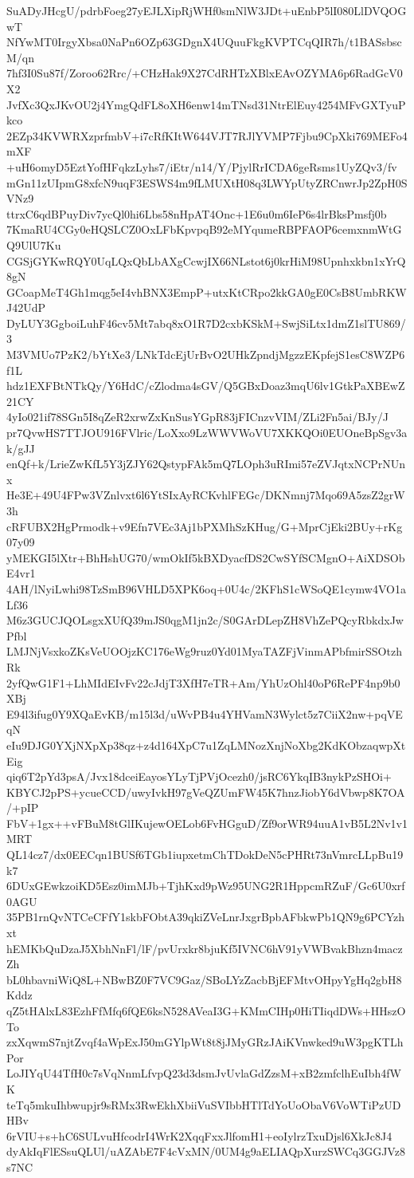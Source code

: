 SuADyJHcgU/pdrbFoeg27yEJLXipRjWHf0smNlW3JDt+uEnbP5lI080LlDVQOGwT
NfYwMT0IrgyXbsa0NaPn6OZp63GDgnX4UQuuFkgKVPTCqQIR7h/t1BASsbscM/qn
7hf3I0Su87f/Zoroo62Rrc/+CHzHak9X27CdRHTzXBlxEAvOZYMA6p6RadGcV0X2
JvfXc3QxJKvOU2j4YmgQdFL8oXH6enw14mTNsd31NtrElEuy4254MFvGXTyuPkco
2EZp34KVWRXzprfmbV+i7cRfKItW644VJT7RJlYVMP7Fjbu9CpXki769MEFo4mXF
+uH6omyD5EztYofHFqkzLyhs7/iEtr/n14/Y/PjylRrICDA6geRsms1UyZQv3/fv
mGn11zUIpmG8xfcN9uqF3ESWS4m9fLMUXtH08q3LWYpUtyZRCnwrJp2ZpH0SVNz9
ttrxC6qdBPuyDiv7ycQl0hi6Lbs58nHpAT4Onc+1E6u0m6IeP6s4lrBksPmsfj0b
7KmaRU4CGy0eHQSLCZ0OxLFbKpvpqB92eMYqumeRBPFAOP6cemxnmWtGQ9UlU7Ku
CGSjGYKwRQY0UqLQxQbLbAXgCcwjIX66NLstot6j0krHiM98Upnhxkbn1xYrQ8gN
GCoapMeT4Gh1mqg5eI4vhBNX3EmpP+utxKtCRpo2kkGA0gE0CsB8UmbRKWJ42UdP
DyLUY3GgboiLuhF46cv5Mt7abq8xO1R7D2cxbKSkM+SwjSiLtx1dmZ1slTU869/3
M3VMUo7PzK2/bYtXe3/LNkTdcEjUrBvO2UHkZpndjMgzzEKpfejS1esC8WZP6f1L
hdz1EXFBtNTkQy/Y6HdC/cZlodma4sGV/Q5GBxDoaz3mqU6lv1GtkPaXBEwZ21CY
4yIo021if78SGn5I8qZeR2xrwZxKnSusYGpR83jFICnzvVIM/ZLi2Fn5ai/BJy/J
pr7QvwHS7TTJOU916FVlric/LoXxo9LzWWVWoVU7XKKQOi0EUOneBpSgv3ak/gJJ
enQf+k/LrieZwKfL5Y3jZJY62QstypFAk5mQ7LOph3uRImi57eZVJqtxNCPrNUnx
He3E+49U4FPw3VZnlvxt6l6YtSIxAyRCKvhlFEGc/DKNmnj7Mqo69A5zsZ2grW3h
cRFUBX2HgPrmodk+v9Efn7VEc3Aj1bPXMhSzKHug/G+MprCjEki2BUy+rKg07y09
yMEKGI5lXtr+BhHshUG70/wmOkIf5kBXDyacfDS2CwSYfSCMgnO+AiXDSObE4vr1
4AH/lNyiLwhi98TzSmB96VHLD5XPK6oq+0U4c/2KFhS1cWSoQE1cymw4VO1aLf36
M6z3GUCJQOLsgxXUfQ39mJS0qgM1jn2c/S0GArDLepZH8VhZePQcyRbkdxJwPfbl
LMJNjVsxkoZKsVeUOOjzKC176eWg9ruz0Yd01MyaTAZFjVinmAPbfmirSSOtzhRk
2yfQwG1F1+LhMIdEIvFv22cJdjT3XfH7eTR+Am/YhUzOhl40oP6RePF4np9b0XBj
E94l3ifug0Y9XQaEvKB/m15l3d/uWvPB4u4YHVamN3Wylct5z7CiiX2nw+pqVEqN
eIu9DJG0YXjNXpXp38qz+z4d164XpC7u1ZqLMNozXnjNoXbg2KdKObzaqwpXtEig
qiq6T2pYd3psA/Jvx18dceiEayosYLyTjPVjOcezh0/jsRC6YkqIB3nykPzSHOi+
KBYCJ2pPS+ycueCCD/uwyIvkH97gVeQZUmFW45K7hnzJiobY6dVbwp8K7OA/+pIP
FbV+1gx++vFBuM8tGlIKujewOELob6FvHGguD/Zf9orWR94uuA1vB5L2Nv1v1MRT
QL14cz7/dx0EECqn1BUSf6TGb1iupxetmChTDokDeN5cPHRt73nVmrcLLpBu19k7
6DUxGEwkzoiKD5Esz0imMJb+TjhKxd9pWz95UNG2R1HppcmRZuF/Gc6U0xrf0AGU
35PB1rnQvNTCeCFfY1skbFObtA39qkiZVeLnrJxgrBpbAFbkwPb1QN9g6PCYzhxt
hEMKbQuDzaJ5XbhNnFl/lF/pvUrxkr8bjuKf5IVNC6hV91yVWBvakBhzn4maczZh
bL0hbavniWiQ8L+NBwBZ0F7VC9Gaz/SBoLYzZacbBjEFMtvOHpyYgHq2gbH8Kddz
qZ5tHAlxL83EzhFfMfq6fQE6ksN528AVeaI3G+KMmCIHp0HiTIiqdDWs+HHszOTo
zxXqwmS7njtZvqf4aWpExJ50mGYlpWt8t8jJMyGRzJAiKVnwked9uW3pgKTLhPor
LoJIYqU44TfH0c7sVqNnmLfvpQ23d3dsmJvUvlaGdZzsM+xB2zmfclhEuIbh4fWK
teTq5mkuIhbwupjr9sRMx3RwEkhXbiiVuSVIbbHTlTdYoUoObaV6VoWTiPzUDHBv
6rVIU+s+hC6SULvuHfcodrI4WrK2XqqFxxJlfomH1+eoIylrzTxuDjsl6XkJc8J4
dyAkIqFlESsuQLUl/uAZAbE7F4cVxMN/0UM4g9aELIAQpXurzSWCq3GGJVz8s7NC
